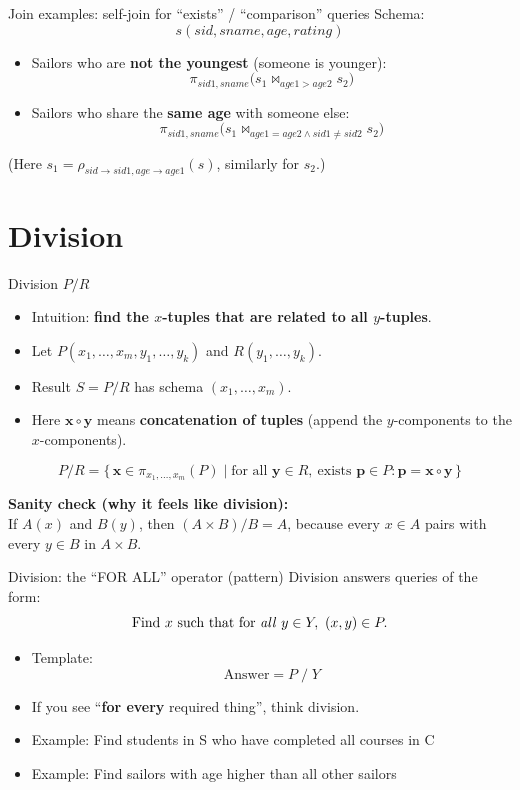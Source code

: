 \documentclass[10pt,aspectratio=169]{beamer}
\newcommand{\proj}{\pi}
\newcommand{\rename}{\rho}
\begin{document}
\begin{frame}{Join examples: self-join for “exists” / “comparison” queries}
\small
Schema:
\[
s(sid,sname,age,rating)
\]
\begin{itemize}
  \item Sailors who are \textbf{not the youngest} (someone is younger):
  \[
  \proj_{sid1,sname}\big(s_1 \Join_{age1>age2} s_2\big)
  \]
  \item Sailors who share the \textbf{same age} with someone else:
  \[
  \proj_{sid1,sname}\big(s_1 \Join_{age1=age2 \wedge sid1\neq sid2} s_2\big)
  \]
\end{itemize}
\small (Here \(s_1=\rename_{sid\rightarrow sid1,age\rightarrow age1}(s)\), similarly for \(s_2\).)
\end{frame}

\section{Division}

\begin{frame}{Division \(P / R\)}
\begin{itemize}
  \item Intuition: \textbf{find the \(x\)-tuples that are related to all \(y\)-tuples}.
  \item Let \(P(x_1,\dots,x_m,y_1,\dots,y_k)\) and \(R(y_1,\dots,y_k)\).
  \item Result \(S = P/R\) has schema \((x_1,\dots,x_m)\).
  \item Here \(\mathbf{x}\circ \mathbf{y}\) means \textbf{concatenation of tuples}
        (append the \(y\)-components to the \(x\)-components).
\end{itemize}

\small
\[
P/R=\{\,\mathbf{x}\in \proj_{x_1,\dots,x_m}(P)\mid
\mbox{for all }\mathbf{y}\in R,\ \mbox{exists }\mathbf{p}\in P:
\mathbf{p}=\mathbf{x}\circ \mathbf{y}\,\}
\]

\small
\textbf{Sanity check (why it feels like division):}\\[-0.2em]
If \(A(x)\) and \(B(y)\), then \((A \times B)/B = A\), because every \(x\in A\)
pairs with every \(y\in B\) in \(A \times B\).
\end{frame}


\begin{frame}{Division: the “FOR ALL” operator (pattern)}
Division answers queries of the form:
\[
\text{Find } x \text{ such that for \emph{all} } y \in Y,\ (x,y)\in P.
\]
\begin{itemize}
  \item Template:
  \[
  \text{Answer} = P \; / \; Y
  \]
  \item If you see “\textbf{for every} required thing”, think division.
  \item Example: Find students in S who have completed all courses in C
  \item Example: Find sailors with age higher than all other sailors
\end{itemize}
\end{frame}
\end{document}
